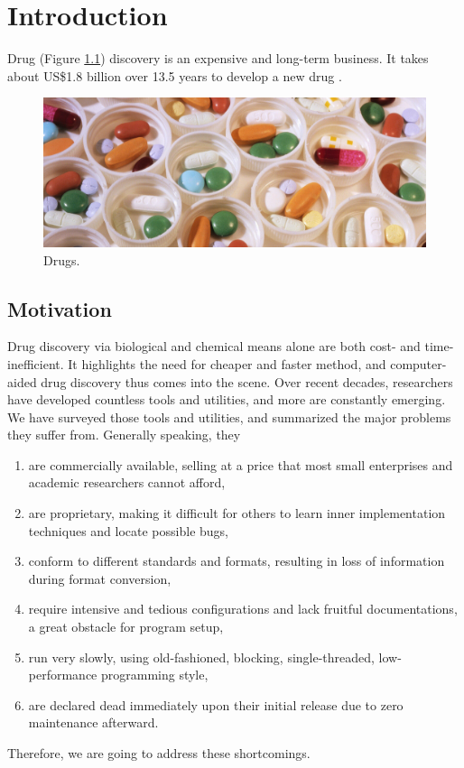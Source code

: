 \chapter{Introduction}

Drug (Figure \ref{Introduction:Drugs}) discovery is an expensive and long-term business. It takes about US\$1.8 billion over 13.5 years to develop a new drug \citep{716}.

\begin{figure}[h]
\centering
\includegraphics[width=\textwidth]{Introduction/Drugs.jpg}
\caption{Drugs.}
\label{Introduction:Drugs}
\end{figure}

\section{Motivation}

Drug discovery via biological and chemical means alone are both cost- and time-inefficient. It highlights the need for cheaper and faster method, and computer-aided drug discovery thus comes into the scene. Over recent decades, researchers have developed countless tools and utilities, and more are constantly emerging. We have surveyed those tools and utilities, and summarized the major problems they suffer from. Generally speaking, they
\begin{enumerate}
\item are commercially available, selling at a price that most small enterprises and academic researchers cannot afford,
\item are proprietary, making it difficult for others to learn inner implementation techniques and locate possible bugs,
\item conform to different standards and formats, resulting in loss of information during format conversion,
\item require intensive and tedious configurations and lack fruitful documentations, a great obstacle for program setup,
\item run very slowly, using old-fashioned, blocking, single-threaded, low-performance programming style,
\item are declared dead immediately upon their initial release due to zero maintenance afterward.
\end{enumerate}
Therefore, we are going to address these shortcomings.

